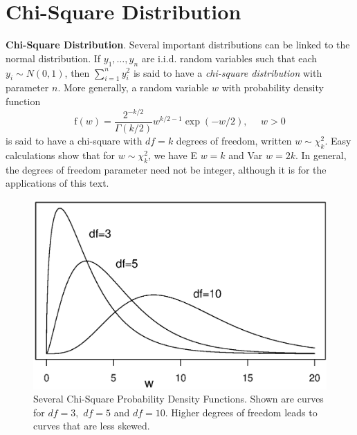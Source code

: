 \newpage
\section{Chi-Square Distribution}

\textbf{Chi-Square Distribution}. Several important distributions
can be linked to the normal distribution. If $y_1, \ldots, y_n$ are
i.i.d. random variables such that each $y_i \sim N(0,1)$, then
$\sum_{i=1}^n y_i^2$ is said to have a \emph{chi-square
distribution} with parameter $n$. More generally, a random variable
$w$ with probability density function
\begin{equation*}
\mathrm{f}(w)=\frac{2^{-k/2}}{\Gamma(k/2)} w^{k/2-1} \exp (-w/2),
~~~~~~w>0
\end{equation*}
is said to have a chi-square with $df=k$ degrees of freedom, written
$w \sim \chi_k^2$. Easy calculations show that for $w \sim
\chi_k^2$, we have E $w = k$ and Var $w = 2 k$. In general, the
degrees of freedom parameter need not be integer, although it is for
the applications of this text.

\begin{figure}[htp]
  \begin{center}
    \includegraphics[scale=.6]{Appendices/FAppendChiSq.eps}
    \caption{ \small  Several Chi-Square Probability Density Functions. Shown are curves for $df=3,$
    $df=5$ and $df = 10$. Higher degrees of freedom leads to curves that are less skewed.}
  \end{center}
\end{figure}


